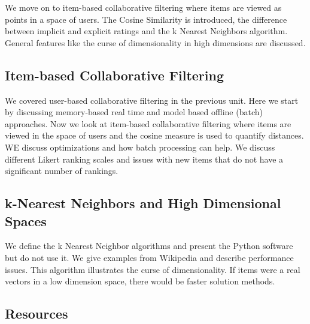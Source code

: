 We move on to item-based collaborative filtering where items are viewed
as points in a space of users. The Cosine Similarity is introduced, the
difference between implicit and explicit ratings and the k Nearest
Neighbors algorithm. General features like the curse of dimensionality
in high dimensions are discussed.



\subsection{Item-based Collaborative Filtering}

We covered user-based collaborative filtering in the previous unit. Here
we start by discussing memory-based real time and model based offline
(batch) approaches. Now we look at item-based collaborative filtering
where items are viewed in the space of users and the cosine measure is
used to quantify distances. WE discuss optimizations and how batch
processing can help. We discuss different Likert ranking scales and
issues with new items that do not have a significant number of rankings.




\subsection{k-Nearest Neighbors and High Dimensional Spaces}

We define the k Nearest Neighbor algorithms and present the Python
software but do not use it. We give examples from Wikipedia and describe
performance issues. This algorithm illustrates the curse of
dimensionality. If items were a real vectors in a low dimension space,
there would be faster solution methods.


\subsection{Resources}



